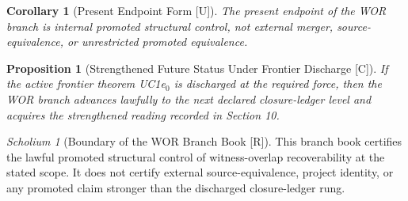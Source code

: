 \documentclass[11pt]{article}
\newtheorem{proposition}[theorem]{Proposition}
\newtheorem{corollary}[theorem]{Corollary}
\theoremstyle{definition}
\theoremstyle{remark}
\newtheorem{scholium}[theorem]{Scholium}
\newcommand{\U}{\textnormal{[U]}}
\newcommand{\C}{\textnormal{[C]}}
\newcommand{\R}{\textnormal{[R]}}
\begin{document}
\begin{corollary}[Present Endpoint Form {\U}]
The present endpoint of the WOR branch is internal promoted structural control, not external merger, source-equivalence, or unrestricted promoted equivalence.
\end{corollary}

\begin{proposition}[Strengthened Future Status Under Frontier Discharge {\C}]
If the active frontier theorem UC1e$_0$ is discharged at the required force, then the WOR branch advances lawfully to the next declared closure-ledger level and acquires the strengthened reading recorded in Section 10.
\end{proposition}

\begin{scholium}[Boundary of the WOR Branch Book {\R}]
This branch book certifies the lawful promoted structural control of witness-overlap recoverability at the stated scope. It does not certify external source-equivalence, project identity, or any promoted claim stronger than the discharged closure-ledger rung.
\end{scholium}
\end{document}
